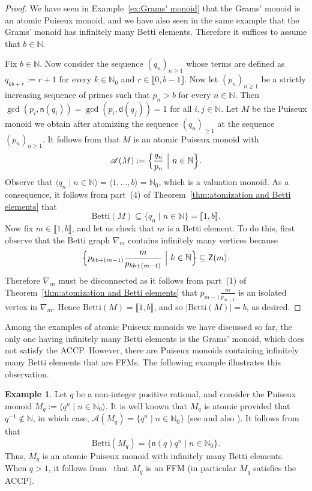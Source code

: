 \documentclass[12pt]{amsart}
\theoremstyle{definition}
\newtheorem{example}[theorem]{Example}
\numberwithin{equation}{section}
\newcommand{\nn}{\mathbb{N}}
\providecommand\ldb{\llbracket}
\providecommand\rdb{\rrbracket}
\begin{document}
\begin{proof}
	We have seen in Example~\ref{ex:Grams' monoid} that the Grams' monoid is an atomic Puiseux monoid, and we have also seen in the same example that the Grams' monoid has infinitely many Betti elements. Therefore it suffices to assume that $b \in \nn$.
	
	Fix $b \in \nn$. Now consider the sequence $(q_n)_{n \ge 1}$ whose terms are defined as $q_{kb + r} := r+1$ for every $k \in \nn_0$ and $r \in \ldb 0,b-1 \rdb$. Now let $(p_n)_{n \ge 1}$ be a strictly increasing sequence of primes such that $p_n > b$ for every $n \in \nn$. Then $\gcd(p_i, \mathsf{n}(q_i)) = \gcd(p_i, \mathsf{d}(q_j)) = 1$ for all $i,j \in \nn$. Let $M$ be the Puiseux monoid we obtain after atomizing the sequence $(q_n)_{\ge 1}$ at the sequence $(p_n)_{n \ge 1}$. It follows from \cite[Proposition~3.1]{GL23} that $M$ is an atomic Puiseux monoid with
	\[
		\mathcal{A}(M) := \Big\{ \frac{q_n}{p_n} \ \Big{|} \ n \in \nn \Big\}.
	\]
	Observe that $\langle q_n \mid n \in \nn \rangle = \langle 1, \dots, b \rangle = \nn_0$, which is a valuation monoid. As a consequence, it follows from part~(4) of Theorem~\ref{thm:atomization and Betti elements} that
	\[
		\text{Betti}(M) \subseteq \{q_n \mid n \in \nn\} = \ldb 1,b \rdb.
	\]
	Now fix $m \in \ldb 1,b \rdb$, and let us check that $m$ is a Betti element. To do this, first observe that the Betti graph $\nabla_m$ contains infinitely many vertices because
	\[
		\Big\{ p_{kb + (m-1)}\frac{m}{p_{kb + (m-1)}} \ \Big{|} \ k \in \nn \Big\} \subseteq \mathsf{Z}(m).
	\]
	Therefore $\nabla_m$ must be disconnected as it follows from part~(1) of Theorem~\ref{thm:atomization and Betti elements} that $p_{m-1} \frac{m}{p_{m-1}}$ is an isolated vertex in $\nabla_m$. Hence $\text{Betti}(M) = \ldb 1,b \rdb$, and so $|\text{Betti}(M)| = b$, as desired.
\end{proof}

Among the examples of atomic Puiseux monoids we have discussed so far, the only one having infinitely many Betti elements is the Grams' monoid, which does not satisfy the ACCP. However, there are Puiseux monoids containing infinitely many Betti elements that are FFMs. The following example illustrates this observation.

\begin{example} \label{ex:multiplicatively cyclic PM}
	Let $q$ be a non-integer positive rational, and consider the Puiseux monoid $M_q := \langle q^n \mid n \in \nn_0 \rangle$. It is well known that $M_q$ is atomic provided that $q^{-1} \notin \nn$, in which case, $\mathcal{A}(M_q) = \{q^n \mid n \in \nn_0\}$ (see \cite[Theorem~6.2]{GG18} and also \cite[Theorem~4.2]{CG22}). It follows from \cite[Lemma~4.3]{ABLST23} that 
	\[
		\text{Betti}(M_q) = \big\{ \mathsf{n}(q) q^n \mid n \in \nn_0 \big\}.
	\]
	Thus, $M_q$ is an atomic Puiseux monoid with infinitely many Betti elements. When $q>1$, it follows from~\cite[Theorem~5.6]{fG19} that $M_q$ is an FFM (in particular $M_q$ satisfies the ACCP).
\end{example}
\end{document}
